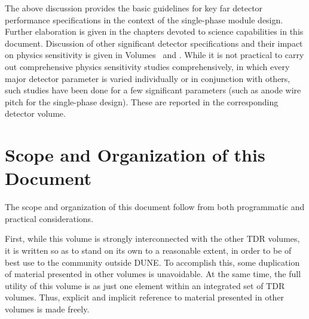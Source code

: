 The above discussion provides the basic guidelines for key far 
detector performance specifications in the context of the 
single-phase module design.  Further elaboration is given in the 
chapters devoted to science capabilities in this document.  
Discussion of other significant detector specifications 
and their impact on 
physics sensitivity is given in Volumes~\voltitlesp{} and 
\voltitledp{}.  While it is not practical to carry out 
comprehensive physics sensitivity studies comprehensively, in 
which every major detector parameter is varied individually or 
in conjunction with others, such studies have been done 
for a few significant parameters (such as anode wire pitch for 
the single-phase \lartpc design).  These are reported in the 
corresponding detector volume.







\section{Scope and Organization of this Document}
\label{sec:exec-scope}

The scope and organization of this document follow from
both programmatic and practical considerations.

First, while this volume is strongly interconnected with
the other TDR volumes, it is written so as to stand on its
own to a reasonable extent, in order to be of best use to the
community outside DUNE.  To accomplish this, some duplication
of material presented in other volumes is unavoidable.
At the same time, the full utility of this volume
is as just one element within an integrated set of TDR volumes.
Thus, explicit and implicit reference
to material presented in other volumes is made freely.

